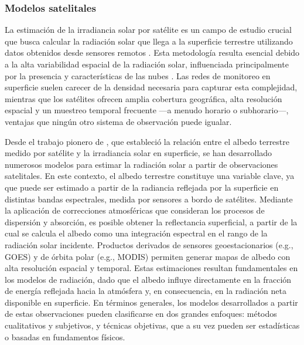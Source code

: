 \documentclass[letterpaper,12pt, twoside]{report}
\providecommand{\DIFdeltex}[1]{{\protect\color{red} \scriptsize #1}} %
\providecommand{\DIFdel}[1]{\texorpdfstring{\DIFdeltex{#1}}{}} %
\begin{document}
\subsubsection{\DIFdel{Modelos satelitales}}
\addtocounter{subsubsection}{-1}%

\DIFdel{La estimación de la irradiancia solar por satélite es un campo de estudio crucial que busca calcular la radiación solar que llega a la superficie terrestre utilizando datos obtenidos desde sensores remotos \cite{Hay1993, ALONSOSUAREZ2012}. Esta metodología resulta esencial debido a la alta variabilidad espacial de la radiación solar, influenciada principalmente por la presencia y características de las nubes \cite{Laguarda2022}. Las redes de monitoreo en superficie suelen carecer de la densidad necesaria para capturar esta complejidad, mientras que los satélites ofrecen amplia cobertura geográfica, alta resolución espacial y un muestreo temporal frecuente —a menudo horario o subhorario—, ventajas que ningún otro sistema de observación puede igualar.
}%

\DIFdel{Desde el trabajo pionero de \cite{Fritz1964}, que estableció la relación entre el albedo terrestre medido por satélite y la irradiancia solar en superficie, se han desarrollado numerosos modelos para estimar la radiación solar a partir de observaciones satelitales. En este contexto, el albedo terrestre constituye una variable clave, ya que puede ser estimado a partir de la radiancia reflejada por la superficie en distintas bandas espectrales, medida por sensores a bordo de satélites. Mediante la aplicación de correcciones atmosféricas que consideran los procesos de dispersión y absorción, es posible obtener la reflectancia superficial, a partir de la cual se calcula el albedo como una integración espectral en el rango de la radiación solar incidente. Productos derivados de sensores geoestacionarios (e.g., GOES) y de órbita polar (e.g., MODIS) permiten generar mapas de albedo con alta resolución espacial y temporal. Estas estimaciones resultan fundamentales en los modelos de radiación, dado que el albedo influye directamente en la fracción de energía reflejada hacia la atmósfera y, en consecuencia, en la radiación neta disponible en superficie. En términos generales, los modelos desarrollados a partir de estas observaciones pueden clasificarse en dos grandes enfoques: métodos cualitativos y subjetivos, y técnicas objetivas, que a su vez pueden ser estadísticas o basadas en fundamentos físicos.
}%
\end{document}
